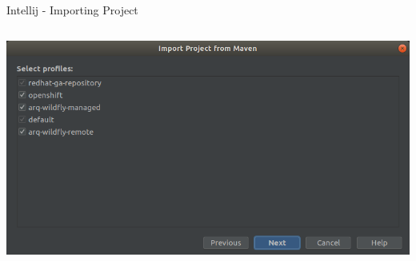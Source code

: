 \documentclass[aspectratio=1610,english]{beamer} %
\begin{document}
\begin{frame}{Intellij - Importing Project}
\begin{columns}
{					\includegraphics[scale=0.15]{IntelliJ_ImportView_3_cut.png}
				}
		\end{columns}
	\end{frame}
\end{document}
